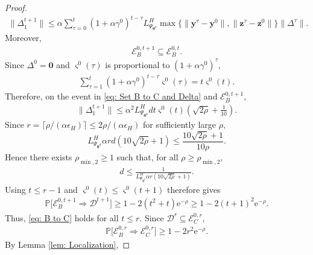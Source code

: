 \documentclass{siamart251216}
\begin{document}
\begin{proof}
    \begin{gather}
        \label{eq: Delta 1}
        \|\Delta_{1}^{t+1}\|\leq\alpha\sum_{\tau=0}^{t}(1+\alpha\gamma^{0})^{t-\tau}L_{\Psi_{\boldsymbol{\theta}^{0}}}^{H}
        \max\{\|\mathbf{y}^{\tau}-\mathbf{y}^{0}\|,\|\mathbf{z}^{\tau}-\mathbf{z}^{0}\|\}\|\Delta^{\tau}\|.
    \end{gather}
    Moreover,
    \begin{gather}
        \label{eq: B to B at t+1}
        \mathcal{E}_{B}^{0,t+1}\subseteq\mathcal{E}_{B}^{0,t}.
    \end{gather}
    Since $\Delta^{0}=\bm{0}$ and $\varsigma^{0}(\tau)$ is proportional to $(1+\alpha\gamma^{0})^{\tau}$,
    \begin{gather}
        \label{eq: Geometric sequence}
        \sum_{\tau=1}^{t}(1+\alpha\gamma^{0})^{t-\tau}\varsigma^{0}(\tau)=t\varsigma^{0}(t).
    \end{gather}
    Therefore, on the event in \eqref{eq: Set B to C and Delta} and $\mathcal{E}_{B}^{0,t+1}$,
    \begin{gather*}
        \|\Delta_{1}^{t+1}\|\leq\alpha^{2}L_{\Psi_{\boldsymbol{\theta}^{0}}}^{H}dt\varsigma^{0}(t)\left(\sqrt{2\rho}+\frac{1}{10}\right).
    \end{gather*}
    Since $r=\lceil\rho/(\alpha\epsilon_H)\rceil\leq2\rho/(\alpha\epsilon_H)$ for sufficiently large $\rho$,
    \[
        L_{\Psi_{\boldsymbol{\theta}^{0}}}^{H}\alpha r d(10\sqrt{2\rho}+1)
        \leq\frac{10\sqrt{2\rho}+1}{10\rho}.
    \]
    Hence there exists $\rho_{\min,2}\geq1$ such that, for all $\rho\geq\rho_{\min,2}$,
    \begin{gather*}
        d\leq\frac{1}{L_{\Psi_{\boldsymbol{\theta}^{0}}}^{H}\alpha r(10\sqrt{2\rho}+1)}.
    \end{gather*}
    Using $t\leq r-1$ and $\varsigma^{0}(t)\leq\varsigma^{0}(t+1)$ therefore gives
    \begin{gather}
        \label{eq: B to C at t+1}
        \mathbb{P}\Big[\mathcal{E}_{B}^{0,t+1}\Rightarrow\mathcal{D}^{t+1}\Big]
        \geq1-2(t^{2}+t)\mathrm{e}^{-\rho}
        \geq1-2(t+1)^{2}\mathrm{e}^{-\rho}.
    \end{gather}
    Thus, \eqref{eq: B to C} holds for all $t\leq r$. Since $\mathcal{D}^{r}\subseteq\mathcal{E}_{C}^{0,r}$,
    \begin{gather*}
        \mathbb{P}\Big[\mathcal{E}_{B}^{0,r}\Rightarrow\mathcal{E}_{C}^{0,r}\Big]\geq1-2r^{2}\mathrm{e}^{-\rho}.
    \end{gather*}
    By Lemma \ref{lem: Localization},

\end{proof}
\end{document}
